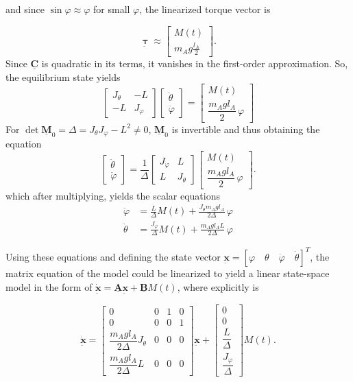 \documentclass[12pt]{article}
\newcommand{\vb}[1]{{\underset{\tilde{}}{\mathbf{#1}}}}
\newcommand{\mb}[1]{\underline{\mathbf{#1}}}
\begin{document}
and since \(\sin \varphi \approx \varphi\) for small $\varphi$, the linearized torque vector is

\[
\vb{\boldsymbol{\uptau}} \approx \begin{bmatrix} M(t) \\  m{}_A g \frac{l{}_A}{2} \end{bmatrix}.
\]
Since $\mb{C}$ is quadratic in its terms, it vanishes in the first-order approximation. So, the equilibrium state yields
\[
\begin{bmatrix}
J_\theta & -L\\
-L & J_\varphi
\end{bmatrix}
\begin{bmatrix}
\ddot\theta\\[2pt]
\ddot\varphi
\end{bmatrix}
=
\begin{bmatrix}
M(t)\\[4pt]
\dfrac{m_A g l_A}{2}\,\varphi
\end{bmatrix}
\]
For $\det \mb{M}_0 = \Delta = J_\theta J_\varphi - L^2 \neq 0$, $\mb{M}_0$ is invertible and thus obtaining the equation
\[
\begin{bmatrix}
\ddot\theta\\[2pt]
\ddot\varphi
\end{bmatrix}
=
\frac{1}{\Delta}
\begin{bmatrix}
J_\varphi & L\\
L & J_\theta
\end{bmatrix}
\begin{bmatrix}
M(t)\\[4pt]
\dfrac{m_A g l_A}{2}\,\varphi
\end{bmatrix}.
\]
which after multiplying, yields the scalar equations
\begin{align*}
    \ddot\varphi &= \frac{L}{\Delta}M(t) + \frac{J_\theta m_A g l_A}{2\Delta}\,\varphi \\
    \ddot\theta &= \frac{J_\varphi}{\Delta}M(t) + \frac{m_A g l_A L}{2\Delta}\,\varphi 
\end{align*}

Using these equations and defining the state vector $\vb{x}=[\varphi \quad \theta \quad \dot{\varphi} \quad \dot{\theta}]^T$, the matrix equation of the model could be linearized to yield a linear state-space model in the form of $\dot{\vb{x}}=\mb{A}\vb{x}+\mb{B}M(t)$, where explicitly is

\begin{equation}
\dot{\vb{x}} =
\begin{bmatrix}
0 & 0 & 1 & 0\\
0 & 0 & 0 & 1\\
\dfrac{m_A g l_A}{2\Delta}J_\theta & 0 & 0 & 0\\[6pt]
\dfrac{m_A g l_A }{2\Delta}L & 0 & 0 & 0
\end{bmatrix}
\vb{x}
+
\begin{bmatrix}
0\\
0\\
\dfrac{L}{\Delta}\\[4pt]
\dfrac{J_\varphi}{\Delta}
\end{bmatrix}
M(t).
\label{eq:linear-state}
\end{equation}
\end{document}
